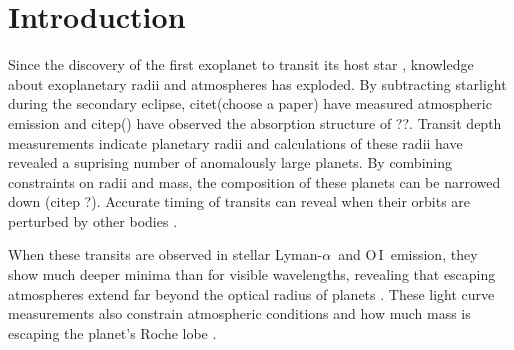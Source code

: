 \documentclass[manuscript]{aastex}
\newcommand{\oi}{\ensuremath{\mathrm{O}\,\scriptstyle \mathrm{I}}}
\newcommand{\lya}{Lyman-$\alpha$}
\begin{document}


\section{Introduction}
Since the discovery of the first exoplanet to transit its host star \citep{charbd,henryd}, knowledge about exoplanetary radii and atmospheres has exploded. By subtracting starlight during the secondary eclipse, citet(choose a paper) have measured atmospheric emission and citep() have observed the absorption structure of ??. Transit depth measurements indicate planetary radii and calculations of these radii have revealed a suprising number of anomalously large planets. By combining constraints on radii and mass, the composition of these planets can be narrowed down (citep ?). Accurate timing of transits can reveal when their orbits are perturbed by other bodies \citep{winnchap}.

When these transits are observed in stellar \lya\ and \oi\ emission, they show much deeper minima than for visible wavelengths, revealing that escaping atmospheres extend far beyond the optical radius of planets \citep{vidmad,benjaf7,mclay,lecav,fossati}. These light curve measurements also constrain atmospheric conditions and how much mass is escaping the planet's Roche lobe \citep{knutsonprop,gmunoz,linsky}.
\end{document}
